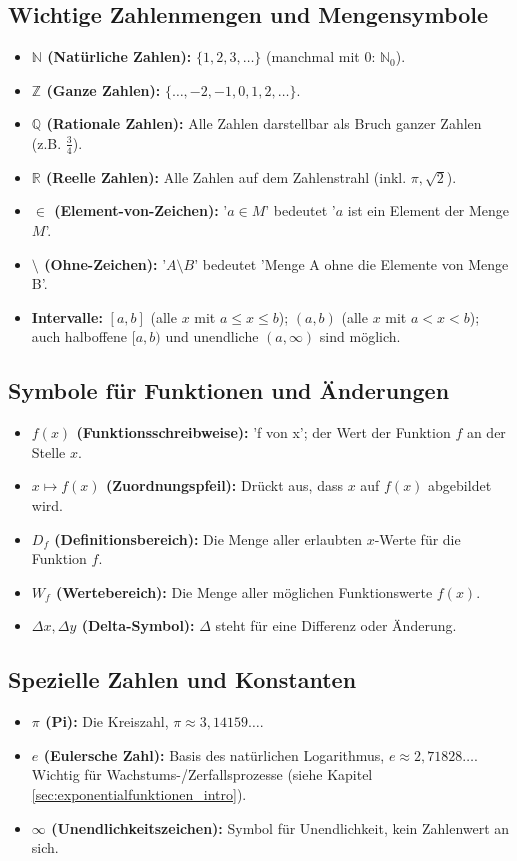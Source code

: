 \subsection{Wichtige Zahlenmengen und Mengensymbole}
\begin{itemize}
    \item \textbf{$\mathbb{N}$ (Natürliche Zahlen):} $\{1, 2, 3, \dots\}$ (manchmal mit $0$: $\mathbb{N}_0$).
    \item \textbf{$\mathbb{Z}$ (Ganze Zahlen):} $\{\dots, -2, -1, 0, 1, 2, \dots\}$.
    \item \textbf{$\mathbb{Q}$ (Rationale Zahlen):} Alle Zahlen darstellbar als Bruch ganzer Zahlen (z.B. $\frac{3}{4}$).
    \item \textbf{$\mathbb{R}$ (Reelle Zahlen):} Alle Zahlen auf dem Zahlenstrahl (inkl. $\pi, \sqrt{2}$).
    \item \textbf{$\in$ (Element-von-Zeichen):} '$a \in M$' bedeutet '$a$ ist ein Element der Menge $M$'.
    \item \textbf{$\setminus$ (Ohne-Zeichen):} '$A \setminus B$' bedeutet 'Menge A ohne die Elemente von Menge B'.
    \item \textbf{Intervalle:} $[a,b]$ (alle $x$ mit $a \le x \le b$); $(a,b)$ (alle $x$ mit $a < x < b$); auch halboffene $[a,b)$ und unendliche $(a, \infty)$ sind möglich.
\end{itemize}

\subsection{Symbole für Funktionen und Änderungen}
\begin{itemize}
    \item \textbf{$f(x)$ (Funktionsschreibweise):} 'f von x'; der Wert der Funktion $f$ an der Stelle $x$.
    \item \textbf{$x \mapsto f(x)$ (Zuordnungspfeil):} Drückt aus, dass $x$ auf $f(x)$ abgebildet wird.
    \item \textbf{$D_f$ (Definitionsbereich):} Die Menge aller erlaubten $x$-Werte für die Funktion $f$.
    \item \textbf{$W_f$ (Wertebereich):} Die Menge aller möglichen Funktionswerte $f(x)$.
    \item \textbf{$\Delta x, \Delta y$ (Delta-Symbol):} $\Delta$ steht für eine Differenz oder Änderung.
\end{itemize}

\subsection{Spezielle Zahlen und Konstanten}
\begin{itemize}
    \item \textbf{$\pi$ (Pi):} Die Kreiszahl, $\pi \approx 3,14159\dots$.
    \item \textbf{$e$ (Eulersche Zahl):} Basis des natürlichen Logarithmus, $e \approx 2,71828\dots$. Wichtig für Wachstums-/Zerfallsprozesse (siehe Kapitel \ref{sec:exponentialfunktionen_intro}).
    \item \textbf{$\infty$ (Unendlichkeitszeichen):} Symbol für Unendlichkeit, kein Zahlenwert an sich.
\end{itemize}

